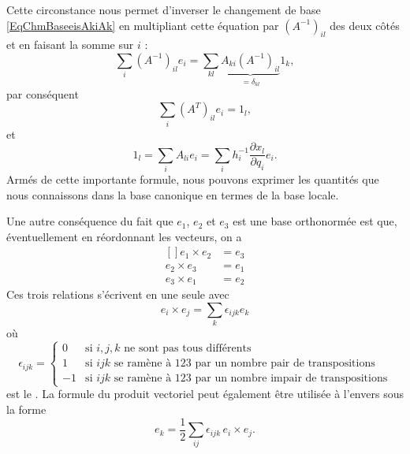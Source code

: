 Cette circonstance nous permet d'inverser le changement de base \eqref{EqChmBaseeisAkiAk} en multipliant cette équation par \( (A^{-1})_{il}\) des deux côtés et en faisant la somme sur \( i\) :
\begin{equation}
	\sum_i (A^{-1})_{il}e_i=\sum_{kl}\underbrace{A_{ki}(A^{-1})_{il}}_{=\delta_{kl}}1_k,
\end{equation}
par conséquent
\begin{equation}
	\sum_i(A^T)_{il}e_i=1_l,
\end{equation}
et
\begin{equation}        \label{EqChamvarunlAei}
	1_l=\sum_iA_{li}e_i=\sum_ih_i^{-1}\frac{ \partial x_l }{ \partial q_i }e_i.
\end{equation}
Armés de cette importante formule, nous pouvons exprimer les quantités que nous connaissons dans la base canonique en termes de la base locale.

Une autre conséquence du fait que \( e_1\), \( e_2\) et \( e_3\) est une base orthonormée est que, éventuellement en réordonnant les vecteurs, on a
\begin{equation}
	\begin{aligned}[]
		e_1\times e_2 & =e_3 \\
		e_2\times e_3 & =e_1 \\
		e_3\times e_1 & =e_2
	\end{aligned}
\end{equation}
Ces trois relations s'écrivent en une seule avec
\begin{equation}
	e_i\times e_j=\sum_{k}\epsilon_{ijk}e_k
\end{equation}
où
\begin{equation}
	\epsilon_{ijk}=\begin{cases}
		0  & \text{si }i, j,k \text{ ne sont pas tous différents}                             \\
		1  & \text{si } ijk    \text{ se ramène à 123 par un nombre pair de transpositions}   \\
		-1 & \text{si } ijk    \text{ se ramène à 123 par un nombre impair de transpositions}
	\end{cases}
\end{equation}
est le . La formule du produit vectoriel peut également être utilisée à l'envers sous la forme
\begin{equation}        \label{Eqekeitimesej}
	e_k=\frac{ 1 }{2}\sum_{ij}\epsilon_{ijk}\,e_i\times e_j.
\end{equation}

